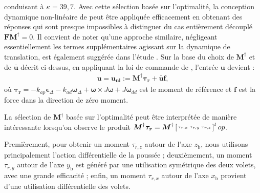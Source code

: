 conduisant à $\kappa = 39,7$. Avec cette sélection basée sur l'optimalité, la conception dynamique non-linéaire de \cite{2020e-MicCenZacFra} peut être appliquée efficacement en obtenant des réponses qui sont presque impossibles à distinguer du cas entièrement découplé 
$\boldsymbol{F}\boldsymbol{M}^{\dag}=0$. Il convient de noter qu'une approche similaire, négligeant essentiellement les termes supplémentaires agissant sur la dynamique de translation, est également suggérée dans l'étude \cite{hamel_minhduc}. 
Sur la base du choix de $\boldsymbol{M}^{\dag}$ et de $\boldsymbol{\bar u}$ décrit ci-dessus, en appliquant la loi de commande de \cite[eqn (19)]{2020e-MicCenZacFra}, l'entrée $\boldsymbol{u}$ devient :
\begin{align}
\label{eq:u_nonlin}
    \boldsymbol{u} = \boldsymbol{u_{\text{nl}}} := \boldsymbol{M}^{\dag} \boldsymbol{\tau_{r}} + \boldsymbol{\bar u} \boldsymbol{f},
\end{align}
où $\boldsymbol{\tau_{r}} = -k_{ap} \boldsymbol{\epsilon}_{\Delta} - k_{ad} \boldsymbol{\omega}_{\Delta} + \boldsymbol{\omega} \times J \boldsymbol{\omega} + J \boldsymbol{\omega}_{dd}$ est le moment de référence et $\boldsymbol{f}$ est la force dans la direction de zéro moment. 

La sélection de $\boldsymbol{M}^{\dag}$ basée sur l'optimalité peut être interprétée de manière intéressante lorsqu'on observe le produit $\boldsymbol{M}^{\dag} \boldsymbol{\tau_{r}} = \boldsymbol{M}^{\dag} \left[ \begin{smallmatrix}\tau_{r,x} & \tau_{r,y} & \tau_{r,z} \end{smallmatrix} \right]^top$. 

Premièrement, pour obtenir un moment $\tau_{r,z}$ autour de l'axe $z_{\text{b}}$, nous utilisons principalement l'action différentielle de la poussée ; deuxièmement, un moment $\tau_{r,y}$ autour de l'axe $y_{\text{b}}$ est généré par une utilisation symétrique des deux volets, avec une grande efficacité ; enfin, un moment $\tau_{r,x}$ autour de l'axe $x_{\text{b}}$ provient d'une utilisation différentielle des volets. 

